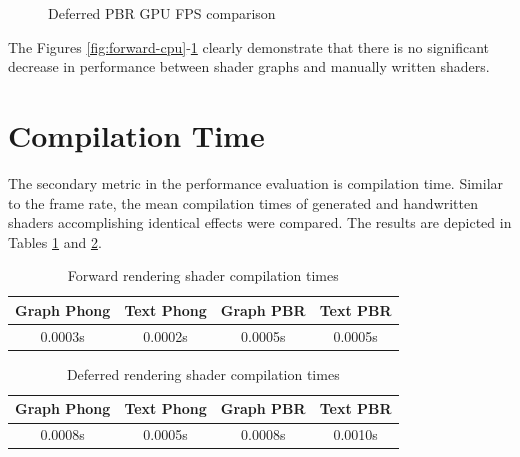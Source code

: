 \documentclass[
  digital,     %
  oneside,     %
  nosansbold,  %
  nocolorbold, %
  lof,         %
  lot,         %
]{fithesis4}
\begin{document}
\begin{figure}[H]
    \centering
    \caption{Deferred PBR GPU FPS comparison}
    \label{fig:deferred-PBR-gpu}
\end{figure}

The Figures \ref{fig:forward-cpu}-\ref{fig:deferred-PBR-gpu} clearly demonstrate that there is no significant decrease
in performance between shader graphs and manually written shaders.

\section{Compilation Time}
The secondary metric in the performance evaluation is compilation time.
Similar to the frame rate, the mean compilation times of generated and handwritten shaders accomplishing identical effects
were compared. The results are depicted in Tables \ref{tab:forward-compile} and \ref{tab:deferred-compile}.

\begin{table}[H]
    \centering
    \begin{tabular}{|c|c|c|c|}
        \hline
        Graph Phong & Text Phong & Graph PBR & Text PBR \\
        \hline
        0.0003s & 0.0002s & 0.0005s & 0.0005s \\
        \hline
    \end{tabular}
    \caption{Forward rendering shader compilation times}
    \label{tab:forward-compile}
\end{table}

\begin{table}[H]
    \centering
    \begin{tabular}{|c|c|c|c|}
        \hline
        Graph Phong & Text Phong & Graph PBR & Text PBR \\
        \hline
        0.0008s & 0.0005s & 0.0008s & 0.0010s \\
        \hline
    \end{tabular}
    \caption{Deferred rendering shader compilation times}
    \label{tab:deferred-compile}
\end{table}
\end{document}
